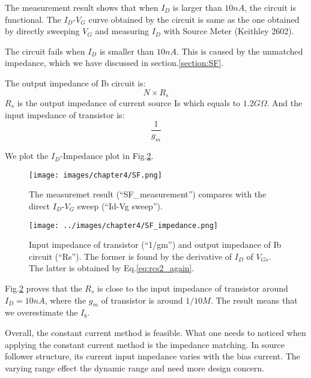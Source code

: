 The measurement result shows that when $I_D$ is larger than $10n A$, the circuit is functional.
The $I_D$-$V_G$ curve obtained by the circuit is same as the one obtained by directly sweeping $V_G$ and measuring $I_D$ with Source Meter (Keithley 2602).

The circuit fails when $I_D$ is smaller than $10n A$.
This is caused by the unmatched impedance, which we have discussed in section.\ref{section:SF}.

The output impedance of Ib circuit is:
\begin{equation} \label{eq:rcs2_again}
    N\times R_s
\end{equation}
$R_s$ is the output impedance of current source Is which equals to $1.2G\Omega$.
And the input impedance of transistor is:
\begin{equation} \label{eq:rsf2_again}
    \frac{1}{g_m}
\end{equation}

We plot the $I_D$-Impedance plot in Fig.\ref{fig:SF_imp}.


 \begin{figure}[!htbp]
    \centering
    \texttt{[image: images/chapter4/SF.png]}
    \caption{The measuremet result (``SF\_measurement'') compares with the direct $I_D$-$V_G$ sweep (``Id-Vg sweep'').}
    \label{fig:SF_result}
\end{figure}

\begin{figure}[!htbp]
   \centering
   \texttt{[image: ../images/chapter4/SF\_impedance.png]}
   \caption{Input impedance of transistor (``1/gm'') and output impedance of Ib circuit (``Rs''). The former is found by the derivative of $I_D$ of $V_{Gs}$. The latter is obtained by Eq.\ref{eq:rcs2_again}.}
   \label{fig:SF_imp}
\end{figure}

Fig.\ref{fig:SF_imp} proves that the $R_s$ is close to the input impedance of transistor around $I_D = 10n A$, where the $g_m$ of transistor is around $1 / 10M$.
The result means that we overestimate the $I_b$.

Overall, the constant current method is feasible.
What one needs to noticed when applying the constant current method is the impedance matching.
In source follower structure, its current input impedance varies with the bias current.
The varying range effect the dynamic range and need more design concern.


